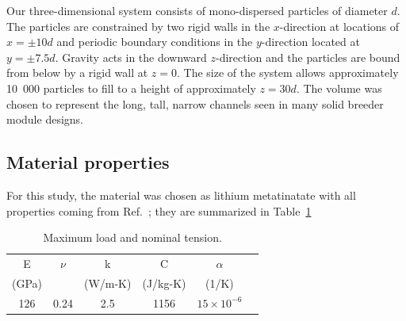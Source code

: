 

Our three-dimensional system consists of mono-dispersed particles of diameter $d$. The particles are constrained by two rigid walls in the $x$-direction at locations of $x = \pm 10d$  and periodic boundary conditions in the $y$-direction located at $y = \pm 7.5d$. Gravity acts in the downward $z$-direction and the particles are bound from below by a rigid wall at $z=0$. The size of the system allows approximately 10~000 particles to fill to a height of approximately $z = 30d$. The volume was chosen to represent the long, tall, narrow channels seen in many solid breeder module designs\cite{ Cho2008, Poitevin2010, Enoeda2003}.


\subsection{Material properties}
For this study, the material was chosen as lithium metatinatate with all properties coming from Ref.~\cite{Gierszewski1998}; they are summarized in Table~\ref{tab:matProps}

\begin {table}[tp] %
\caption{Maximum load and nominal tension.}
\label {tab:matProps} \centering %
\begin {tabular}{ cccccc }
\toprule %
E            &     $\nu$    &       k         &    C             &   $\alpha$                     \\
(GPa)    &                     &(W/m-K)  &  (J/kg-K)  &   (1/K)                                   \\\toprule
126       &      0.24       &  2.5          &  1156       &  $15\times10^{-6}$       \\\bottomrule
\end{tabular}
\end{table}




